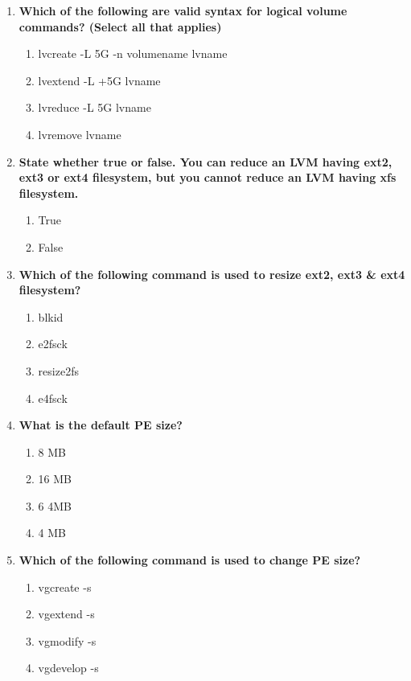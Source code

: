 \begin{flushleft}
\begin{enumerate}
		\item \textbf{Which of the following are valid syntax for logical volume commands? (Select all that applies)}
		\begin{enumerate}[label=(\alph*)]
			\item lvcreate -L 5G -n volumename  lvname  %
			\item lvextend -L +5G  lvname  %
			\item lvreduce -L 5G  lvname  %
			\item lvremove lvname  %
		\end{enumerate}
		\bigskip
		\bigskip	
		\newpage
		\item \textbf{State whether true or false. You can reduce an LVM having ext2, ext3 or ext4 filesystem, but you cannot reduce an LVM having xfs filesystem.}
		\begin{enumerate}[label=(\alph*)]
			\item True %
			\item False
		\end{enumerate}
		\bigskip
		\bigskip
		

		\item \textbf{Which of the following command is used to resize ext2, ext3 \& ext4 filesystem?}
		\begin{enumerate}[label=(\alph*)]
			\item blkid
			\item e2fsck
			\item resize2fs   %
			\item e4fsck
		\end{enumerate}
		\bigskip
		\bigskip	


		\item \textbf{What is the default PE size?}
		\begin{enumerate}[label=(\alph*)]
			\item 8 MB
			\item 16 MB
			\item 6 4MB
			\item 4 MB   %
		\end{enumerate}
		\bigskip
		\bigskip	

		\item \textbf{Which of the following command is used to change PE size?}
		\begin{enumerate}[label=(\alph*)]
			\item vgcreate -s  %
			\item vgextend -s  
			\item vgmodify -s 
			\item vgdevelop -s  %
		\end{enumerate}
		\bigskip
		\bigskip	
		
	\end{enumerate}
	
	
\end{flushleft}

\newpage

\afterpage{\blankpage}